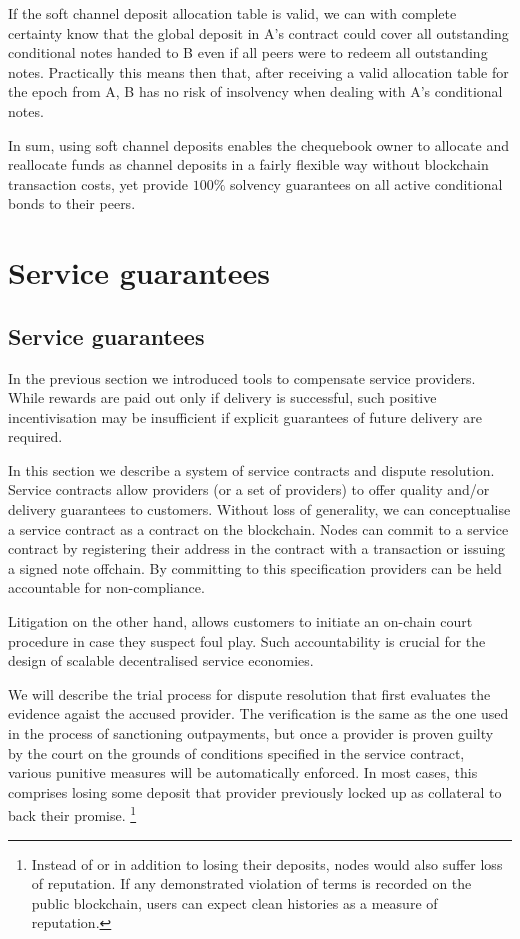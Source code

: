 \documentclass[a4paper,10pt]{article}
\begin{document}
If the soft channel deposit allocation table is valid,
we can with complete certainty know that the global deposit in A's contract
 could cover all outstanding conditional notes handed to B even if all peers were to redeem all outstanding notes.
Practically this means then that, after receiving a valid allocation table for the epoch from A,
B has no risk of insolvency when dealing with A's conditional notes.

In sum, using soft channel deposits enables the chequebook owner to allocate and reallocate funds
as channel deposits in a fairly flexible way without blockchain transaction costs,
yet provide $100\%$ solvency guarantees on all active conditional bonds to their peers.


\section{Service guarantees}

\subsection{Service guarantees}
\label{sec:courtroom}

In the previous section we introduced tools to compensate service providers.
While rewards are paid out only if delivery is successful,
such positive incentivisation may be insufficient if
explicit guarantees of future delivery are required.

In this section we describe a system of service contracts and dispute resolution.
Service contracts allow providers (or a set of providers)
to offer quality and/or delivery guarantees to customers.
Without loss of generality, we can conceptualise a service contract as a contract
on the blockchain.
Nodes can commit to a service contract by registering their address in the contract
with a transaction or issuing a signed note offchain.
By committing to this specification providers can be held accountable for non-compliance.

Litigation on the other hand, allows customers to initiate an on-chain court procedure
in case they suspect foul play. Such accountability is
crucial for the design of scalable decentralised service economies.

We will describe the trial process for dispute
resolution that first evaluates the evidence agaist the accused provider.
The verification is the same as the one used in the process of sanctioning outpayments,
but once a provider is proven guilty by the court on the grounds of
conditions specified in the service contract, various punitive measures will be
automatically enforced. In most cases, this comprises losing some deposit that
provider previously locked up as collateral to back their promise.%
%
\footnote{Instead of or in addition to losing their deposits, nodes would also
suffer loss of reputation. If any demonstrated violation of terms is
recorded on the public blockchain, users can expect clean histories as a measure
of reputation.}
%
\end{document}
